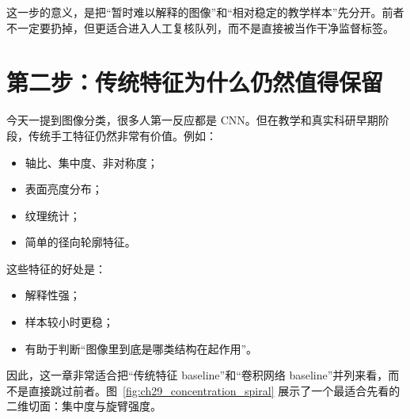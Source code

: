 这一步的意义，是把“暂时难以解释的图像”和“相对稳定的教学样本”先分开。前者不一定要扔掉，但更适合进入人工复核队列，而不是直接被当作干净监督标签。

\section{第二步：传统特征为什么仍然值得保留}

今天一提到图像分类，很多人第一反应都是 CNN。但在教学和真实科研早期阶段，传统手工特征仍然非常有价值。例如：

\begin{itemize}
    \item 轴比、集中度、非对称度；
    \item 表面亮度分布；
    \item 纹理统计；
    \item 简单的径向轮廓特征。
\end{itemize}

这些特征的好处是：

\begin{itemize}
    \item 解释性强；
    \item 样本较小时更稳；
    \item 有助于判断“图像里到底是哪类结构在起作用”。
\end{itemize}

因此，这一章非常适合把“传统特征 baseline”和“卷积网络 baseline”并列来看，而不是直接跳过前者。图~\ref{fig:ch29_concentration_spiral} 展示了一个最适合先看的二维切面：集中度与旋臂强度。


